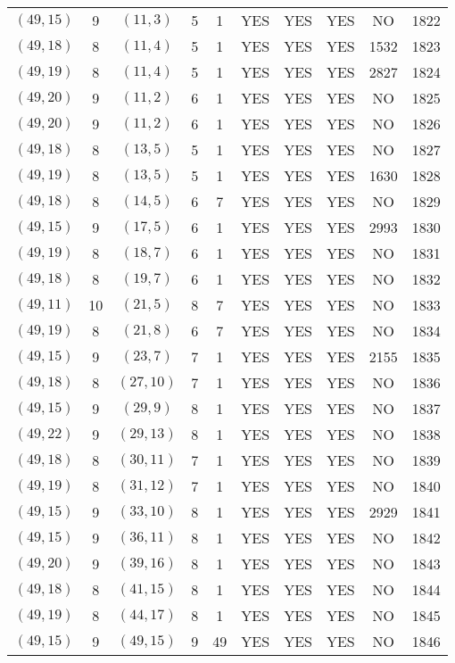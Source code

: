 \begin{longtable}{|c|c|c|c|c|c|c|c|c|c|}
$(49, 15)$ & 9 & $(11, 3)$ & 5 & 1 & YES & YES & YES & NO & 1822\\
$(49, 18)$ & 8 & $(11, 4)$ & 5 & 1 & YES & YES & YES & 1532 & 1823\\
$(49, 19)$ & 8 & $(11, 4)$ & 5 & 1 & YES & YES & YES & 2827 & 1824\\
$(49, 20)$ & 9 & $(11, 2)$ & 6 & 1 & YES & YES & YES & NO & 1825\\
$(49, 20)$ & 9 & $(11, 2)$ & 6 & 1 & YES & YES & YES & NO & 1826\\
$(49, 18)$ & 8 & $(13, 5)$ & 5 & 1 & YES & YES & YES & NO & 1827\\
$(49, 19)$ & 8 & $(13, 5)$ & 5 & 1 & YES & YES & YES & 1630 & 1828\\
$(49, 18)$ & 8 & $(14, 5)$ & 6 & 7 & YES & YES & YES & NO & 1829\\
$(49, 15)$ & 9 & $(17, 5)$ & 6 & 1 & YES & YES & YES & 2993 & 1830\\
$(49, 19)$ & 8 & $(18, 7)$ & 6 & 1 & YES & YES & YES & NO & 1831\\
$(49, 18)$ & 8 & $(19, 7)$ & 6 & 1 & YES & YES & YES & NO & 1832\\
$(49, 11)$ & 10 & $(21, 5)$ & 8 & 7 & YES & YES & YES & NO & 1833\\
$(49, 19)$ & 8 & $(21, 8)$ & 6 & 7 & YES & YES & YES & NO & 1834\\
$(49, 15)$ & 9 & $(23, 7)$ & 7 & 1 & YES & YES & YES & 2155 & 1835\\
$(49, 18)$ & 8 & $(27, 10)$ & 7 & 1 & YES & YES & YES & NO & 1836\\
$(49, 15)$ & 9 & $(29, 9)$ & 8 & 1 & YES & YES & YES & NO & 1837\\
$(49, 22)$ & 9 & $(29, 13)$ & 8 & 1 & YES & YES & YES & NO & 1838\\
$(49, 18)$ & 8 & $(30, 11)$ & 7 & 1 & YES & YES & YES & NO & 1839\\
$(49, 19)$ & 8 & $(31, 12)$ & 7 & 1 & YES & YES & YES & NO & 1840\\
$(49, 15)$ & 9 & $(33, 10)$ & 8 & 1 & YES & YES & YES & 2929 & 1841\\
$(49, 15)$ & 9 & $(36, 11)$ & 8 & 1 & YES & YES & YES & NO & 1842\\
$(49, 20)$ & 9 & $(39, 16)$ & 8 & 1 & YES & YES & YES & NO & 1843\\
$(49, 18)$ & 8 & $(41, 15)$ & 8 & 1 & YES & YES & YES & NO & 1844\\
$(49, 19)$ & 8 & $(44, 17)$ & 8 & 1 & YES & YES & YES & NO & 1845\\
$(49, 15)$ & 9 & $(49, 15)$ & 9 & 49 & YES & YES & YES & NO & 1846\\

\end{longtable}
